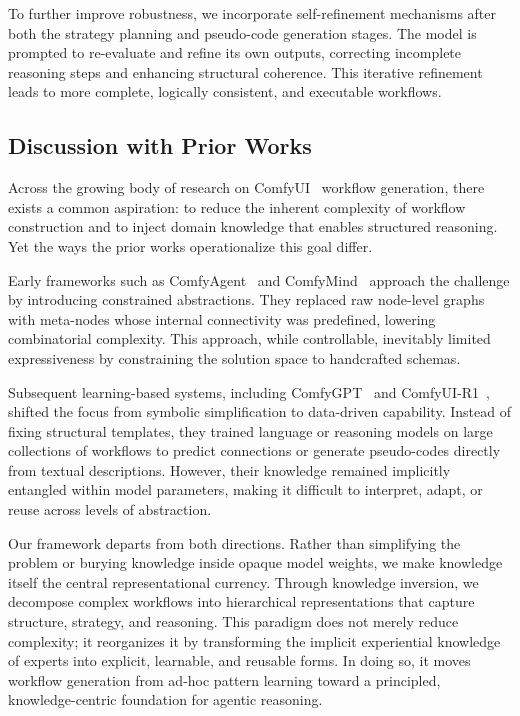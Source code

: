 \documentclass[runningheads]{llncs}
\begin{document}
To further improve robustness, we incorporate self-refinement mechanisms after both the strategy planning and pseudo-code generation stages.
%
The model is prompted to re-evaluate and refine its own outputs, correcting incomplete reasoning steps and enhancing structural coherence.
%
This iterative refinement leads to more complete, logically consistent, and executable workflows.

\subsection{Discussion with Prior Works}
%
Across the growing body of research on ComfyUI~\cite{xu2025comfyuir1} workflow generation, there exists a common aspiration: to reduce the inherent complexity of workflow construction and to inject domain knowledge that enables structured reasoning.
%
Yet the ways the prior works operationalize this goal differ.

Early frameworks such as ComfyAgent~\cite{xue2025comfybench} and ComfyMind~\cite{guo2025comfymind} approach the challenge by introducing constrained abstractions.
%
They replaced raw node-level graphs with meta-nodes whose internal connectivity was predefined, lowering combinatorial complexity.
%
This approach, while controllable, inevitably limited expressiveness by constraining the solution space to handcrafted schemas.

Subsequent learning-based systems, including ComfyGPT~\cite{huang2025comfygpt} and ComfyUI-R1~\cite{xu2025comfyuir1}, shifted the focus from symbolic simplification to data-driven capability.
%
Instead of fixing structural templates, they trained language or reasoning models on large collections of workflows to predict connections or generate pseudo-codes directly from textual descriptions.
%
However, their knowledge remained implicitly entangled within model parameters, making it difficult to interpret, adapt, or reuse across levels of abstraction.

Our framework departs from both directions.
%
Rather than simplifying the problem or burying knowledge inside opaque model weights, we make knowledge itself the central representational currency.
%
Through knowledge inversion, we decompose complex workflows into hierarchical representations that capture structure, strategy, and reasoning.
%
This paradigm does not merely reduce complexity; it reorganizes it by transforming the implicit experiential knowledge of experts into explicit, learnable, and reusable forms.
%
In doing so, it moves workflow generation from ad-hoc pattern learning toward a principled, knowledge-centric foundation for agentic reasoning.
\end{document}

